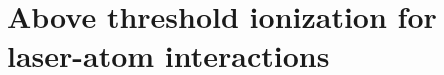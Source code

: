 


\section{Above threshold ionization for laser-atom interactions}
\label{ch:ati_results}


























































